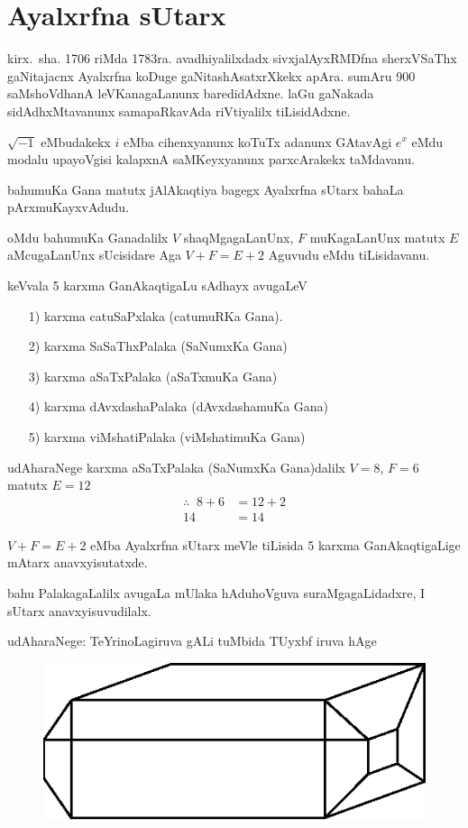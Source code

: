 \chapter{Ayalxrfna sUtarx}

\vskip -20pt

kirx.~sha. {\rm 1706} riMda {\rm 1783}ra. avadhiyalilxdadx sivxjalAyxRMDfna sherxVSaThx gaNitajacnx Ayalxrfna koDuge gaNitashAsatxrXkekx apAra. sumAru {\rm 900} saMshoVdhanA leVKanagaLanunx baredidAdxne. laGu gaNakada sidAdhxMtavanunx samapaRkavAda riVtiyalilx tiLisidAdxne.

$\sqrt{-1}$ eMbudakekx $i$ eMba cihenxyanunx koTuTx adanunx GAtavAgi $e^x$ eMdu modalu upayoVgisi kalapxnA saMKeyxyanunx parxcArakekx taMdavanu.

bahumuKa Gana matutx jAlAkaqtiya bagegx Ayalxrfna sUtarx bahaLa pArxmuKayxvAdudu.

oMdu bahumuKa Ganadalilx $V$ shaqMgagaLanUnx, $F$ muKagaLanUnx matutx $E$ aMcugaLanUnx sUcisidare Aga $V+F=E+2$ Aguvudu eMdu tiLisidavanu. 

keVvala {\rm 5} karxma GanAkaqtigaLu sAdhayx avugaLeV
\begin{enumerate}
\item[{\rm 1)}] karxma catuSaPxlaka (catumuRKa Gana).
\item[{\rm 2)}] karxma SaSaThxPalaka (SaNumxKa Gana)
\item[{\rm 3)}] karxma aSaTxPalaka (aSaTxmuKa Gana)
\item[{\rm 4)}] karxma dAvxdashaPalaka (dAvxdashamuKa Gana)
\item[{\rm 5)}] karxma viMshatiPalaka (viMshatimuKa Gana)
\end{enumerate}

udAharaNege karxma aSaTxPalaka (SaNumxKa Gana)dalilx \quad $V=8$, \quad $F=6$ matutx $E=12$ 
\begin{align*}
\therefore \;\; 8+6 &=12+2\\
14 &=14
\end{align*}

$V+F=E+2$ eMba Ayalxrfna sUtarx meVle tiLisida {\rm 5} karxma GanAkaqtigaLige mAtarx anavxyisutatxde.

bahu PalakagaLalilx avugaLa mUlaka hAduhoVguva suraMgagaLidadxre, I sUtarx anavxyisuvudilalx.

udAharaNege: TeYrinoLagiruva gALi tuMbida TUyxbf iruva hAge
\begin{figure}[H]
\centering
\includegraphics{src/figures/m-147.eps}
\end{figure}

